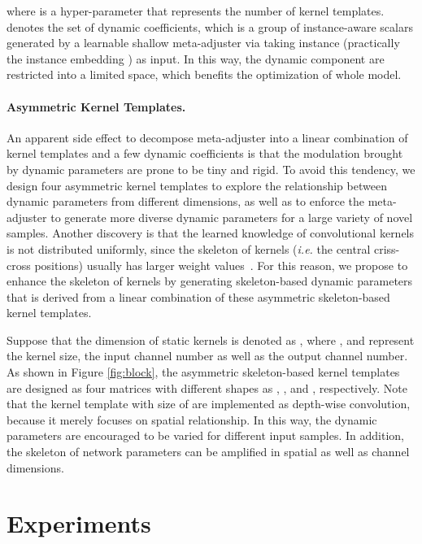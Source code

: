 \documentclass{article}
\begin{document}
where  is a hyper-parameter that represents the number of kernel templates.  denotes the set of dynamic coefficients, which is a group of instance-aware scalars generated by a learnable shallow meta-adjuster  via taking instance  (practically the instance embedding ) as input. In this way, the dynamic component are restricted into a limited space, which benefits the optimization of whole model. 

\paragraph{Asymmetric Kernel Templates.}
An apparent side effect to decompose meta-adjuster into a linear combination of kernel templates and a few dynamic coefficients is that the modulation brought by dynamic parameters are prone to be tiny and rigid. To avoid this tendency, we design four asymmetric kernel templates to explore the relationship between dynamic parameters from different dimensions, as well as to enforce the meta-adjuster to generate more diverse dynamic parameters for a large variety of novel samples. Another discovery is that the learned knowledge of convolutional kernels is not distributed uniformly, since the skeleton of kernels (\emph{i.e.} the central criss-cross positions) usually has larger weight values~\cite{ding2019acnet}. For this reason, we propose to enhance the skeleton of kernels by generating skeleton-based dynamic parameters that is derived from a linear combination of these asymmetric skeleton-based kernel templates.

Suppose that the dimension of static kernels  is denoted as , where ,  and  represent the kernel size, the input channel number as well as the output channel number. As shown in Figure \ref{fig:block}, the asymmetric skeleton-based kernel templates are designed as four matrices with different shapes as , ,  and , respectively. Note that the kernel template with size of  are implemented as depth-wise convolution, because it merely focuses on spatial relationship. In this way, the dynamic parameters are encouraged to be varied for different input samples. In addition, the skeleton of network parameters can be amplified in spatial as well as channel dimensions.













\section{Experiments}
\end{document}
